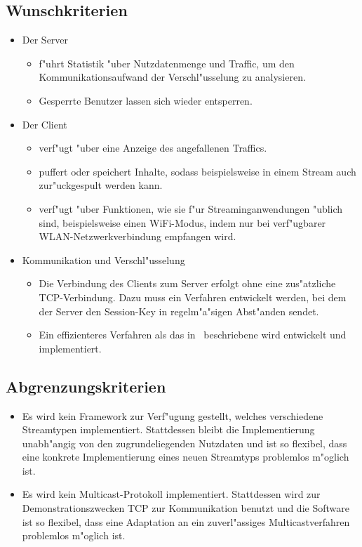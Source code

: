 \documentclass[a4paper,10pt]{scrartcl}
\begin{document}
\subsection{Wunschkriterien}

\begin{itemize}

\item Der Server
\begin{itemize}
   \item f"uhrt Statistik "uber Nutzdatenmenge und Traffic, um den Kommunikationsaufwand
         der Verschl"usselung zu analysieren.
   \item Gesperrte Benutzer lassen sich wieder entsperren.
\end{itemize}

\item Der Client
\begin{itemize}
   \item verf"ugt "uber eine Anzeige des angefallenen Traffics.
   \item puffert oder speichert Inhalte, sodass beispielsweise in einem Stream auch
         zur"uckgespult werden kann.
   \item verf"ugt "uber Funktionen, wie sie f"ur Streaminganwendungen "ublich sind,
         beispielsweise einen WiFi-Modus, indem nur bei verf"ugbarer WLAN-Netzwerkverbindung
         empfangen wird.
\end{itemize}

\item Kommunikation und Verschl"usselung
\begin{itemize}
   \item Die Verbindung des Clients zum Server erfolgt ohne eine zus"atzliche TCP-Verbindung.
         Dazu muss ein Verfahren entwickelt werden, bei dem der Server den Session-Key
         in regelm"a"sigen Abst"anden sendet.
   \item Ein effizienteres Verfahren als das in~\cite{Naor00} beschriebene wird
         entwickelt und implementiert.
\end{itemize}
\end{itemize}

\subsection{Abgrenzungskriterien}
\begin{itemize}
   \item Es wird kein Framework zur Verf"ugung gestellt, welches verschiedene
         Streamtypen implementiert. Stattdessen bleibt die Implementierung
         unabh"angig von den zugrundeliegenden Nutzdaten und ist so flexibel,
         dass eine konkrete Implementierung eines neuen Streamtyps problemlos
         m"oglich ist.
   \item Es wird kein Multicast-Protokoll implementiert. Stattdessen wird
         zur Demonstrationszwecken TCP zur Kommunikation benutzt und die Software
         ist so flexibel, dass eine Adaptation an ein zuverl"assiges
         Multicastverfahren problemlos m"oglich ist.
\end{itemize}
\end{document}
